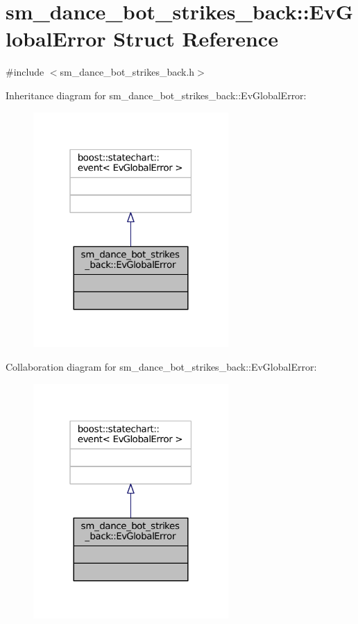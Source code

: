\hypertarget{structsm__dance__bot__strikes__back_1_1EvGlobalError}{}\section{sm\+\_\+dance\+\_\+bot\+\_\+strikes\+\_\+back\+:\+:Ev\+Global\+Error Struct Reference}
\label{structsm__dance__bot__strikes__back_1_1EvGlobalError}


{\ttfamily \#include $<$sm\+\_\+dance\+\_\+bot\+\_\+strikes\+\_\+back.\+h$>$}



Inheritance diagram for sm\+\_\+dance\+\_\+bot\+\_\+strikes\+\_\+back\+:\+:Ev\+Global\+Error\+:
\nopagebreak
\begin{figure}[H]
\begin{center}
\leavevmode
\includegraphics[width=211pt]{structsm__dance__bot__strikes__back_1_1EvGlobalError__inherit__graph}
\end{center}
\end{figure}


Collaboration diagram for sm\+\_\+dance\+\_\+bot\+\_\+strikes\+\_\+back\+:\+:Ev\+Global\+Error\+:
\nopagebreak
\begin{figure}[H]
\begin{center}
\leavevmode
\includegraphics[width=211pt]{structsm__dance__bot__strikes__back_1_1EvGlobalError__coll__graph}
\end{center}
\end{figure}


